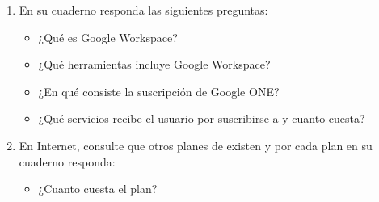 \documentclass[letterpaper,10pt,spanish]{sphinxmanual}
\begin{document}
\begin{enumerate}
\begin{quote}
\sphinxAtStartPar
{}: “El encargado de la biblioteca escolar crea un sistema estructurado para registrar el inventario de libros, los datos de los estudiantes y las fechas de devolución, facilitando la búsqueda rápida de ejemplares disponibles.”
\end{quote}
\begin{quote}

\sphinxAtStartPar
{}: “Un estudiante de grado undécimo redacta su proyecto de grado utilizando herramientas de edición para estructurar el índice, insertar citas bibliográficas y exportar el informe final en formato PDF para su entrega formal.”
\end{quote}
\begin{quote}

\sphinxAtStartPar
{}: “Un equipo de trabajo diseña una exposición visual sobre la cuarta revolución industrial, integrando imágenes, animaciones y transiciones para comunicar sus hallazgos de forma atractiva ante un comité evaluador.”
\end{quote}
\begin{quote}

\sphinxAtStartPar
{}: “El tesorero de una pequeña empresa organiza los gastos mensuales mediante el uso de fórmulas automáticas para calcular el IVA, generar gráficos de barras que muestren las tendencias de consumo y filtrar datos por categorías de proveedores.”
\end{quote}

\item {} 
\sphinxAtStartPar
En su cuaderno responda las siguientes preguntas:
\begin{itemize}
\item {} 
\sphinxAtStartPar
¿Qué es Google Workspace?

\item {} 
\sphinxAtStartPar
¿Qué herramientas incluye Google Workspace?

\item {} 
\sphinxAtStartPar
¿En qué consiste la suscripción de Google ONE?

\item {} 
\sphinxAtStartPar
¿Qué servicios recibe el usuario por suscribirse a  y cuanto cuesta?

\end{itemize}

\item {} 
\sphinxAtStartPar
En Internet, consulte que otros planes de  existen y por cada plan en su cuaderno responda:
\begin{itemize}
\item {} 
\sphinxAtStartPar
¿Cuanto cuesta el plan?


\end{itemize}
\end{enumerate}
\end{document}
